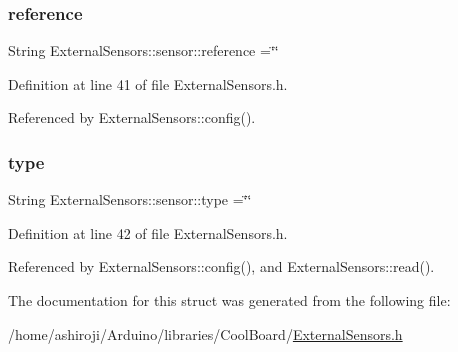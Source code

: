 \subsubsection{\texorpdfstring{reference}{reference}}
{\footnotesize\ttfamily String External\+Sensors\+::sensor\+::reference =\char`\"{}\char`\"{}}



Definition at line 41 of file External\+Sensors.\+h.



Referenced by External\+Sensors\+::config().

\mbox{\label{structExternalSensors_1_1sensor_a6acfdb02c742c2110d7bd2b5d9fce9e7}} 
\subsubsection{\texorpdfstring{type}{type}}
{\footnotesize\ttfamily String External\+Sensors\+::sensor\+::type =\char`\"{}\char`\"{}}



Definition at line 42 of file External\+Sensors.\+h.



Referenced by External\+Sensors\+::config(), and External\+Sensors\+::read().



The documentation for this struct was generated from the following file\+:\begin{DoxyCompactItemize}
\item 
/home/ashiroji/\+Arduino/libraries/\+Cool\+Board/\hyperlink{ExternalSensors_8h}{External\+Sensors.\+h}\end{DoxyCompactItemize}
